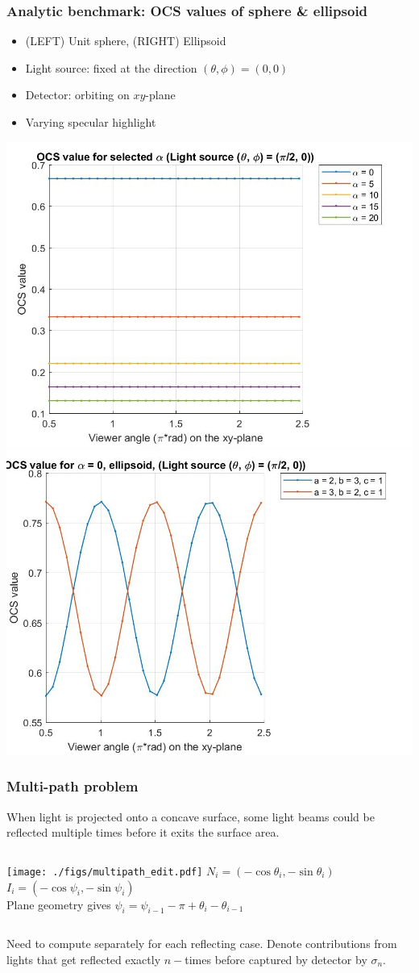 \documentclass{beamer}
\begin{document}
\begin{frame}[t]
\frametitle{Analytic benchmark: OCS values of sphere \& ellipsoid}
\begin{itemize}
\item (LEFT) Unit sphere, (RIGHT) Ellipsoid
\item Light source: fixed at the direction $(\theta,\phi) = (0,0)$
\item Detector: orbiting on $xy$-plane
\item Varying specular highlight
\end{itemize}
\begin{center}
\includegraphics[width=.45\textwidth]{./figs/OCS_perpendicular_plane}
\includegraphics[width=.45\textwidth]{./figs/OCS_perpendicular_plane_ellipsoid}
\end{center}
\end{frame}


\begin{frame}[t]
\frametitle{Multi-path problem}
When light is projected onto a concave surface, some light beams could be reflected multiple times before it exits the surface area. 
\begin{columns}
 \texttt{[image: ./figs/multipath\_edit.pdf]}
 $N_i=(-\cos \theta_i,-\sin\theta_i)$\\ $I_i=(-\cos \psi_i,-\sin\psi_i)$\\ Plane geometry gives $\psi_{i}=\psi_{i-1}-\pi+\theta_i-\theta_{i-1}$
\end{columns}
Need to compute separately for each reflecting case. Denote contributions from lights that get reflected exactly $n-$times before captured by detector by $\sigma_n$.
\end{frame}
\end{document}

